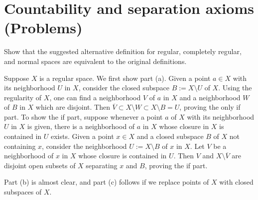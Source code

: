 \section{Countability and separation axioms (Problems)}

\begin{prob}\label{separability equivalences}
    Show that the suggested alternative definition for regular, completely regular, and normal spaces are equivalent to the original definitions.
\end{prob}
\begin{sol}
    Suppose $X$ is a regular space.
    We first show part (a).
    Given a point $a\in X$ with its neighborhood $U$ in $X$, consider the closed subspace $B:=X\setminus U$ of $X$.
    Using the regularity of $X$, one can find a neighborhood $V$ of $a$ in $X$ and a neighborhood $W$ of $B$ in $X$ which are disjoint.
    Then $\overline{V}\subset X\setminus W\subset X\setminus B=U$, proving the only if part.
    To show the if part, suppose whenever a point $a$ of $X$ with its neighborhood $U$ in $X$ is given, there is a neighborhood of $a$ in $X$ whose closure in $X$ is contained in $U$ exists.
    Given a point $x\in X$ and a closed subspace $B$ of $X$ not containing $x$, consider the neighborhood $U:=X\setminus B$ of $x$ in $X$.
    Let $V$ be a neighborhood of $x$ in $X$ whose closure is contained in $U$.
    Then $V$ and $X\setminus\overline{V}$ are disjoint open subsets of $X$ separating $x$ and $B$, proving the if part.

    Part (b) is almost clear, and part (c) follows if we replace points of $X$ with closed subspaces of $X$.
\end{sol}

\color{red}
\begin{prob}
    
\end{prob}
\begin{sol}
    
\end{sol}
\color{black}

